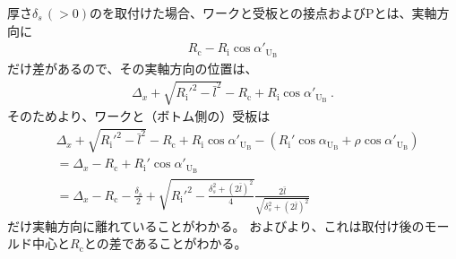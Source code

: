 \clearpage
\expandafterindex{\yomiSpacerThickness@\nameSpacerThickness}厚さ$\delta_s\,(>0)$の\Spacer を取付けた場合、ワークと受板との接点および\TableCenter Pとは、実軸方向に
\begin{align*}
  R_\mathrm c-R_\mathrm i\cos\alpha'_{\mathrm U_\mathrm B}
\end{align*}
だけ差があるので、その実軸方向の位置は、
\begin{align*}
  \Delta_x+\sqrt{R_\mathrm i'^2-\bar l^2}-R_\mathrm c+R_\mathrm i\cos\alpha'_{\mathrm U_\mathrm B}\ .
\end{align*}
そのためより、ワークと（ボトム側の）受板は
\begin{align*}
  &  \Delta_x+\sqrt{R_\mathrm i'^2-\bar l^2}-R_\mathrm c+R_\mathrm i\cos\alpha'_{\mathrm U_\mathrm B}
     -\left(R_\mathrm i'\cos\alpha_{\mathrm U_\mathrm B}+\rho\cos\alpha'_{\mathrm U_\mathrm B}\right)\\
  &= \Delta_x-R_\mathrm c+R_\mathrm i'\cos\alpha'_{\mathrm U_\mathrm B}\\
  &= \Delta_x-R_\mathrm c
     -\frac{\delta_s}2+\sqrt{R_\mathrm i'^2-\frac{\delta_s^2+(2\bar l)^2}4}\frac{2\bar l}{\sqrt{\delta_s^2+(2\bar l)^2}}
\end{align*}
だけ実軸方向に離れていることがわかる。
およびより、これは\Spacer 取付け後のモールド中心と\CenterCurvature$R_\mathrm c$との差であることがわかる。
